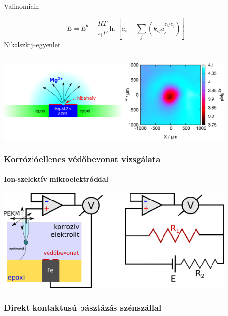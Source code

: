 \documentclass{beamer}
\begin{document}
\begin{frame}
\begin{columns}[T]
\begin{column}{.48\textwidth}
Valinomicin
\vfill

\footnotesize
\begin{equation*}
        E=E^\theta + \frac{RT}{z_iF} \ln \left [ a_i + \sum_{j} \left ( k_{ij}a_j^{z_i/z_j} \right ) \right ]
        \end{equation*}
\normalsize
Nikolszkij--egyenlet
\end{column}%
\end{columns}
\end{frame}

\begin{frame}
	\centering
	\includegraphics[width=0.9\textwidth]{hiba.eps}
	\frametitle{Korrózióellenes védőbevonat vizsgálata}
	\framesubtitle{Ion-szelektív mikroelektróddal}
\end{frame}

\begin{frame}
	\centering
	\includegraphics[width=0.9\textwidth]{whisker.eps}
	\frametitle{Direkt kontaktusú pásztázás szénszállal}
\end{frame}
\end{document}
